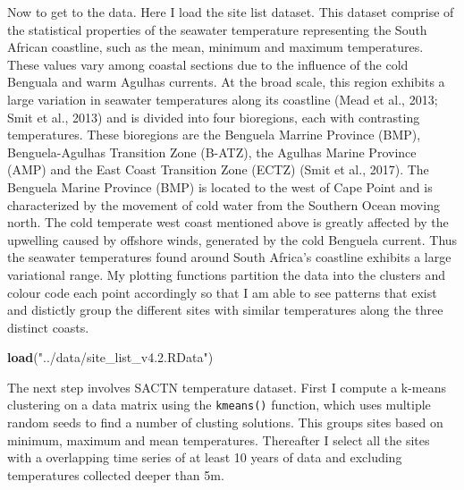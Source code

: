 \documentclass[10pt,a4,]{article}
\newenvironment{Shaded}{\begin{snugshade}}{\end{snugshade}}
\newcommand{\KeywordTok}[1]{\textcolor[rgb]{0.13,0.29,0.53}{\textbf{#1}}}
\newcommand{\NormalTok}[1]{#1}
\newcommand{\StringTok}[1]{\textcolor[rgb]{0.31,0.60,0.02}{#1}}
\begin{document}
Now to get to the data. Here I load the site list dataset. This dataset
comprise of the statistical properties of the seawater temperature
representing the South African coastline, such as the mean, minimum and
maximum temperatures. These values vary among coastal sections due to
the influence of the cold Benguala and warm Agulhas currents. At the
broad scale, this region exhibits a large variation in seawater
temperatures along its coastline (Mead et al., 2013; Smit et al., 2013)
and is divided into four bioregions, each with contrasting temperatures.
These bioregions are the Benguela Marrine Province (BMP),
Benguela-Agulhas Transition Zone (B-ATZ), the Agulhas Marine Province
(AMP) and the East Coast Transition Zone (ECTZ) (Smit et al., 2017). The
Benguela Marine Province (BMP) is located to the west of Cape Point and
is characterized by the movement of cold water from the Southern Ocean
moving north. The cold temperate west coast mentioned above is greatly
affected by the upwelling caused by offshore winds, generated by the
cold Benguela current. Thus the seawater temperatures found around South
Africa's coastline exhibits a large variational range. My plotting
functions partition the data into the clusters and colour code each
point accordingly so that I am able to see patterns that exist and
distictly group the different sites with similar temperatures along the
three distinct coasts.

\begin{Shaded}
\begin{Highlighting}[]
\KeywordTok{load}\NormalTok{(}\StringTok{"../data/site_list_v4.2.RData"}\NormalTok{)}
\end{Highlighting}
\end{Shaded}

\newpage

The next step involves SACTN temperature dataset. First I compute a
k-means clustering on a data matrix using the \texttt{kmeans()}
function, which uses multiple random seeds to find a number of clusting
solutions. This groups sites based on minimum, maximum and mean
temperatures. Thereafter I select all the sites with a overlapping time
series of at least 10 years of data and excluding temperatures collected
deeper than 5m.
\end{document}
